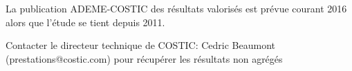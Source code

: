 La publication ADEME-COSTIC des résultats valorisés est prévue courant 2016 alors que l'étude se tient depuis 2011.

Contacter le directeur technique de COSTIC: Cedric Beaumont (prestations@costic.com) pour récupérer les résultats non agrégés 





